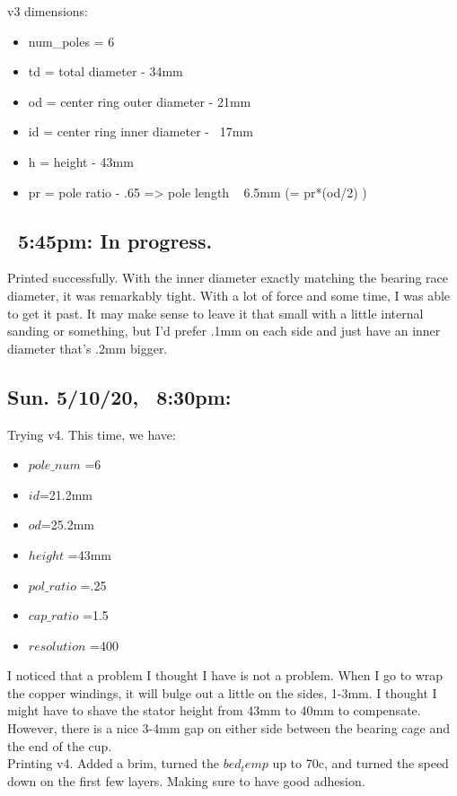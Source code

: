 \documentclass[11pt]{article} %
\begin{document}
v3 dimensions:
\begin{itemize}
\item num\_poles = 6
\item td = total diameter - 34mm
\item od = center ring outer diameter - 21mm
\item id = center ring inner diameter - ~17mm
\item h = height - 43mm
\item pr = pole ratio - .65 => pole length ~ 6.5mm (= pr*(od/2) )
\end{itemize}

\subsection*{~5:45pm: In progress.}

Printed successfully. With the inner diameter exactly matching the bearing race diameter, it was remarkably tight. With a lot of force and some time, I was able to get it past. It may make sense to leave it that small with a little internal sanding or something, but I’d prefer .1mm on each side and just have an inner diameter that’s .2mm bigger.

\subsection*{Sun. 5/10/20, ~8:30pm:}

Trying v4. This time, we have:

\begin{itemize}
\item $pole\_num$ =6
\item $id$=21.2mm
\item $od$=25.2mm
\item $height$ =43mm
\item $pol\_ratio$ =.25
\item $cap\_ratio$ =1.5
\item $resolution$ =400
\end{itemize}

\noindent I noticed that a problem I thought I have is not a problem. When I go to wrap the copper windings, it will bulge out a little on the sides, 1-3mm. I thought I might have to shave the stator height from 43mm to 40mm to compensate. However, there is a nice 3-4mm gap on either side between the bearing cage and the end of the cup. \\

\noindent Printing v4. Added a brim, turned the $bed_temp$ up to 70c, and turned the speed down on the first few layers. Making sure to have good adhesion. \\
\end{document}
